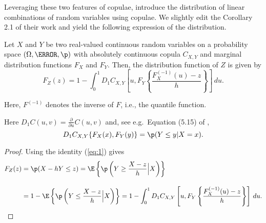 Leveraging these two features of copulae, \citet{barbi2014copula}
introduce the distribution of linear combinations of random variables
using copulae. 
We slightly edit the Corollary 2.1 of their work and yield the
following expression of the distribution. 

\begin{proposition}
  \label{prop:dfrh}
  Let $X$ and $Y$ be two real-valued continuous random
  variables on a
  probability space $(\Omega, \F, \p)$ with
  absolutely continuous copula $C_{X, Y}$ and marginal distribution functions $F_{X}$
  and $F_{Y}$. Then, the distribution function of $Z$ is given by 
  \begin{equation}
    \label{eq:3}
    F_{Z}(z) = 1- \int^1_0 D_1 C_{X, Y}
    \left[ u, F_{Y} \left\{ \frac{F^{(-1)}_{X}(u)-z}{h} \right\}
    \right]\, d u.
  \end{equation}
\end{proposition}
Here, $F^{(-1)}$ denotes the inverse of $F$, i.e., the quantile
function.

Here $D_1 C(u,v)=\displaystyle \frac{\partial}{\partial u} C(u,v)$ and, see e.g.\ Equation (5.15) of
\citep{McNeil2005},
\begin{equation}
  \label{eq:1}
  D_1 C_{X,Y}\{F_X(x), F_Y(y)\} = \p(Y\leq y|X=x).
\end{equation}
\begin{proof}
  Using the identity (\ref{eq:1}) gives
  \begin{align*}
    F_{Z}(z) &= \p(X - h Y\leq z) %
                 = \E\left\{\p\left(Y\geq \frac{X-z}{h}\Big|
                 X\right)\right\}\\[10pt]
               &= 1-\E\left\{\p\left(Y\leq \frac{X-z}{h}\Big|
                 X\right)\right\}%
               = 1- \int_0^1 D_1 C_{X, Y}\left[u,
                 F_{Y}\left\{\frac{F^{(-1)}_{X}(u) -
                 z}{h}\right\}\right]\, d u.
  \end{align*}
  \end{proof}


